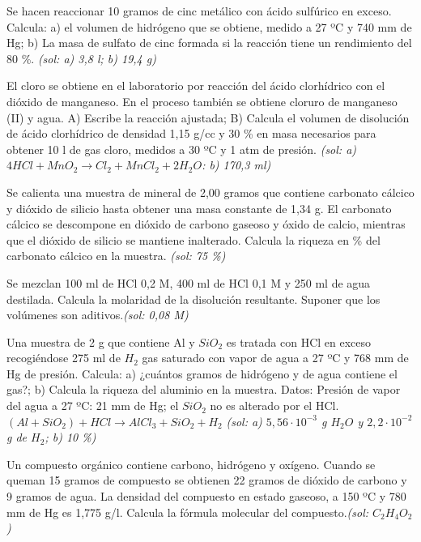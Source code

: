 \begin{multicols}{2}
\begin{problem}
\end{problem}
\begin{problem}
Se hacen reaccionar 10 gramos de cinc metálico con ácido sulfúrico en exceso. Calcula: a) el volumen de hidrógeno que se obtiene, medido a 27 ºC y 740 mm de Hg; b) La masa de sulfato de cinc formada si la reacción tiene un rendimiento del 80 \%.	\textit{\scriptsize(sol: a) 3,8 l; b) 19,4 g)}
\end{problem}
\begin{problem}
El cloro se obtiene en el laboratorio por reacción del ácido clorhídrico con el dióxido de manganeso. En el proceso también se obtiene cloruro de manganeso (II) y agua. A) Escribe la reacción ajustada; B) Calcula el volumen de disolución de ácido clorhídrico de densidad 1,15 g/cc y 30 \% en masa necesarios para obtener 10 l de gas cloro, medidos a 30 ºC y 1 atm de presión. \textit{\scriptsize(sol: a) $4HCl+MnO_2\longrightarrow Cl_2+MnCl_2+2H_2O$: b) 170,3 ml)}
\end{problem}
\begin{problem}
Se calienta una muestra de mineral de 2,00 gramos que contiene carbonato cálcico y dióxido de silicio hasta obtener una masa constante de 1,34 g. El carbonato cálcico se descompone en dióxido de carbono gaseoso y óxido de calcio, mientras que el dióxido de silicio se mantiene inalterado. Calcula la riqueza en \% del carbonato cálcico en la muestra. \textit{\scriptsize(sol: 75 \%)}
\end{problem}
\begin{problem}
Se mezclan 100 ml de HCl 0,2 M, 400 ml de HCl 0,1 M y 250 ml de agua destilada. Calcula la molaridad de la disolución resultante. Suponer que los volúmenes son aditivos.\textit{\scriptsize(sol: 0,08 M)}
\end{problem}
\begin{problem}
Una muestra de 2 g que contiene Al y $SiO_2$ es tratada con HCl en exceso recogiéndose 275 ml de $H_2$ gas saturado con vapor de agua a 27 ºC y 768 mm de Hg de presión. Calcula: a) ¿cuántos gramos de hidrógeno y de agua contiene el gas?; b) Calcula la riqueza del aluminio en la muestra. Datos: Presión de vapor del agua a 27 ºC: 21 mm de Hg; el $SiO_2$ no es alterado por el HCl. $(Al + SiO_2) + HCl \longrightarrow AlCl_3 +SiO_2 + H_2$ \textit{\scriptsize(sol: a) $5,56\cdot10^{-3}$ g $H_2O$ y $2,2\cdot 10^{-2}$ g de $H_2$; b) 10 \%)}	
\end{problem}
\begin{problem}
Un compuesto orgánico contiene carbono, hidrógeno y oxígeno. Cuando se queman 15 gramos de compuesto se obtienen 22 gramos de dióxido de carbono y 9 gramos de agua. La densidad del compuesto en estado gaseoso, a 150 ºC y 780 mm de Hg es 1,775 g/l. Calcula la fórmula molecular del compuesto.\textit{\scriptsize(sol: $C_2H_4O_2$)} 

\end{problem}
\end{multicols}
